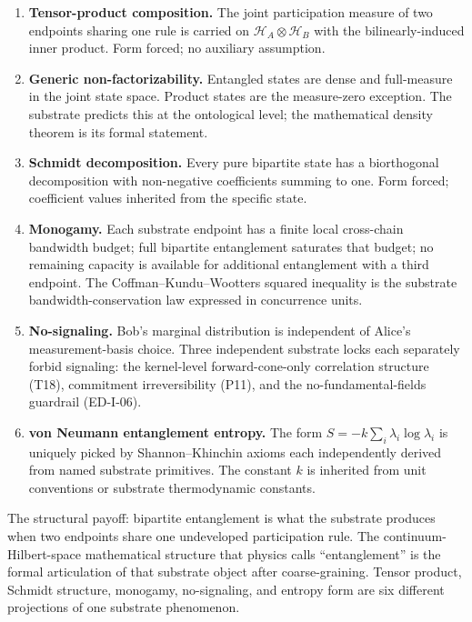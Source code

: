 \documentclass[11pt,a4paper]{article}
\begin{document}
\begin{enumerate}[noitemsep]
  \item \textbf{Tensor-product composition.} The joint participation measure of two endpoints sharing one rule is carried on $\mathcal{H}_A \otimes \mathcal{H}_B$ with the bilinearly-induced inner product. Form forced; no auxiliary assumption.
  \item \textbf{Generic non-factorizability.} Entangled states are dense and full-measure in the joint state space. Product states are the measure-zero exception. The substrate predicts this at the ontological level; the mathematical density theorem is its formal statement.
  \item \textbf{Schmidt decomposition.} Every pure bipartite state has a biorthogonal decomposition with non-negative coefficients summing to one. Form forced; coefficient values inherited from the specific state.
  \item \textbf{Monogamy.} Each substrate endpoint has a finite local cross-chain bandwidth budget; full bipartite entanglement saturates that budget; no remaining capacity is available for additional entanglement with a third endpoint. The Coffman--Kundu--Wootters squared inequality is the substrate bandwidth-conservation law expressed in concurrence units.
  \item \textbf{No-signaling.} Bob's marginal distribution is independent of Alice's measurement-basis choice. Three independent substrate locks each separately forbid signaling: the kernel-level forward-cone-only correlation structure (T18), commitment irreversibility (P11), and the no-fundamental-fields guardrail (ED-I-06).
  \item \textbf{von Neumann entanglement entropy.} The form $S = -k \sum_i \lambda_i \log \lambda_i$ is uniquely picked by Shannon--Khinchin axioms each independently derived from named substrate primitives. The constant $k$ is inherited from unit conventions or substrate thermodynamic constants.
\end{enumerate}

The structural payoff: bipartite entanglement is what the substrate produces when two endpoints share one undeveloped participation rule. The continuum-Hilbert-space mathematical structure that physics calls ``entanglement'' is the formal articulation of that substrate object after coarse-graining. Tensor product, Schmidt structure, monogamy, no-signaling, and entropy form are six different projections of one substrate phenomenon.
\end{document}
